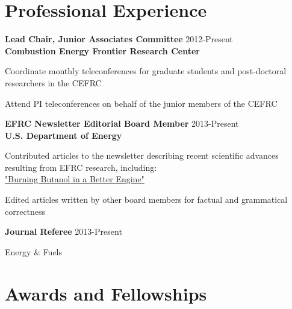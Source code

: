 \section{Professional Experience}
\begin{lonelist}
   \item[] \textbf{Lead Chair, Junior Associates Committee} \hfill 
           2012-Present\\
           \textbf{Combustion Energy Frontier Research Center} 
   \begin{innerlist}
      \item Coordinate monthly teleconferences for graduate students
            and post-doctoral researchers in the CEFRC
      \item Attend PI teleconferences on behalf of the junior members
           of the CEFRC
   \end{innerlist}
   
   \item[] \textbf{EFRC Newsletter Editorial Board Member} \hfill 2013-Present\\
           \textbf{U.S. Department of Energy}
   \begin{innerlist}
       \item Contributed articles to the newsletter describing recent 
             scientific advances resulting from EFRC research, 
             including:\\
             \href{http://www.energyfrontier.us/newsletter/201210/burning-butanol-better-engine}
             {"Burning Butanol in a Better Engine"}
       \item Edited articles written by other board members for factual 
             and grammatical correctness
   \end{innerlist}
   
   \item[] \textbf{Journal Referee} \hfill 2013-Present
   \begin{innerlist}
       \item Energy \& Fuels
   \end{innerlist}
   
\end{lonelist}
 
\vspace{0.5em}

\section{Awards and Fellowships}

